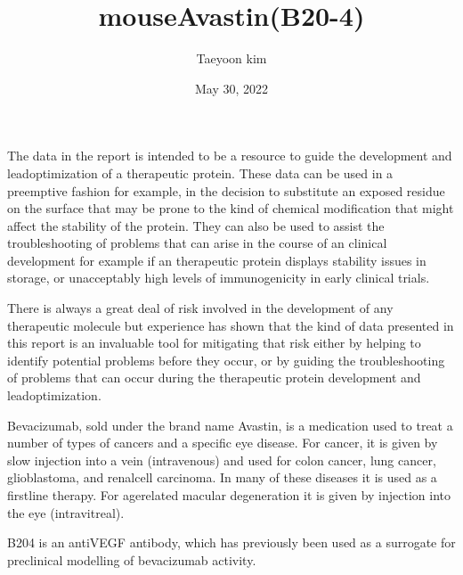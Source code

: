 \documentclass[letterpaper,10pt,english]{jupyterBook}
\title{mouseAvastin(B20-4)}
\date{May 30, 2022}
\author{Taeyoon kim}
\begin{document}
\pagestyle{empty}
\sphinxmaketitle
\pagestyle{plain}
\sphinxtableofcontents
\pagestyle{normal}
\label{\detokenize{intro::doc}}


\begin{DUlineblock}{0em}
\item[] 
\end{DUlineblock}

\sphinxAtStartPar
The data in the report is intended to be a resource to guide the development and lead\sphinxhyphen{}optimization of a therapeutic protein. These data can be used in a preemptive fashion \sphinxhyphen{} for example, in the decision to substitute an exposed residue on the surface that may be prone to the kind of chemical modification that might affect the stability of the protein. They can also be used to assist the troubleshooting of problems that can arise in the course of an clinical development \sphinxhyphen{} for example if an therapeutic protein displays stability issues in storage, or unacceptably high levels of immunogenicity in early clinical trials.

\sphinxAtStartPar
There is always a great deal of risk involved in the development of any therapeutic molecule but experience has shown that the kind of data presented in this report is an invaluable tool for mitigating that risk \sphinxhyphen{} either by helping to identify potential problems before they occur, or by guiding the troubleshooting of problems that can occur during the therapeutic protein development and lead\sphinxhyphen{}optimization.

\begin{DUlineblock}{0em}
\item[] 
\end{DUlineblock}

\sphinxAtStartPar
Bevacizumab, sold under the brand name Avastin, is a medication used to treat a number of types of cancers and a specific eye disease. For cancer, it is given by slow injection into a vein (intravenous) and used for colon cancer, lung cancer, glioblastoma, and renal\sphinxhyphen{}cell carcinoma. In many of these diseases it is used as a first\sphinxhyphen{}line therapy. For age\sphinxhyphen{}related macular degeneration it is given by injection into the eye (intravitreal).

\sphinxAtStartPar
B20\sphinxhyphen{}4 is an anti\sphinxhyphen{}VEGF antibody, which has previously been used as a surrogate for preclinical modelling of bevacizumab activity.
\end{document}
